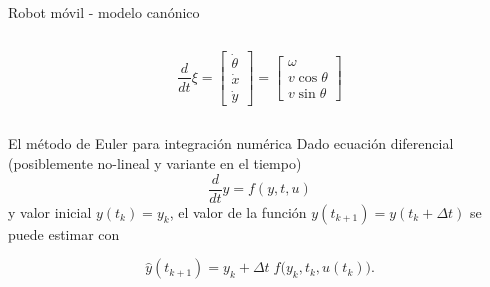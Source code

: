 \documentclass[presentation,aspectratio=169]{beamer}
\begin{document}
\begin{frame}[label={sec:org22073fb}]{Robot móvil - modelo canónico}
\begin{columns}
\begin{column}{0.6\columnwidth}
\[\frac{d}{dt} \xi = \begin{bmatrix} \dot{\theta}\\\dot{x}\\\dot{y} \end{bmatrix} = \begin{bmatrix} \omega\\ v\cos\theta\\v\sin\theta\end{bmatrix} \]
\end{column}
\end{columns}
\end{frame}

\begin{frame}[label={sec:org5e7cc6a}]{El método de Euler para integración numérica}
Dado ecuación diferencial (posiblemente no-lineal y variante en el tiempo)
\[ \frac{d}{dt} y = f(y,t, u) \]
y valor inicial \(y(t_k) = y_k\),
el valor de la función \(y(t_{k+1}) = y(t_k + \Delta t)\) se puede estimar con

\[\hat{y}(t_{k+1}) = y_k + \Delta t \;f\big(y_k, t_k, u(t_k)\big). \]
\end{frame}
\end{document}
